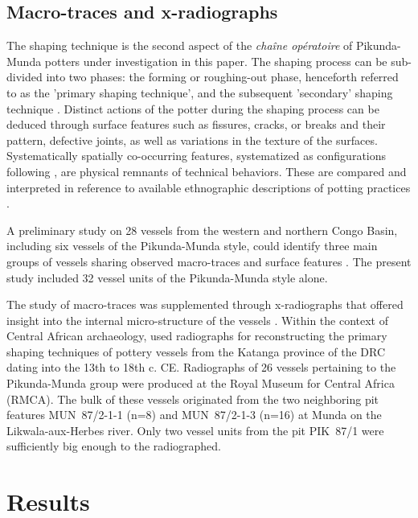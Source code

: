 \documentclass[smallextended,natbib]{svjour3}       %
\begin{document}
\subsection{Macro-traces and x-radiographs}

The shaping technique is the second aspect of the \textit{chaîne opératoire} of Pikunda-Munda potters under investigation in this paper. The shaping process can be sub-divided into two phases: the forming or roughing-out phase, henceforth referred to as the 'primary shaping technique', and the subsequent 'secondary' shaping technique \citep{Shepard.1956,Rye.1981,LivingstoneSmith.2007d,LivingstoneSmith.2010c}. Distinct actions of the potter during the shaping process can be deduced through surface features such as fissures, cracks, or breaks and their pattern, defective joints, as well as variations in the texture of the surfaces. Systematically spatially co-occurring features, systematized as configurations following \citet{LivingstoneSmith.2007d,LivingstoneSmith.2010c}, are physical remnants of technical behaviors. These are compared and interpreted in reference to available ethnographic descriptions of potting practices \citep{Eggert.1980c,KanimbaMisago.1991,Eggert.inVorb.}.

A preliminary study on 28 vessels from the western and northern Congo Basin, including six vessels of the Pikunda-Munda style, could identify three main groups of vessels sharing observed macro-traces and surface features \citep[45--60,69--73]{Seidensticker.2021e}. The present study included 32 vessel units of the Pikunda-Munda style alone.

The study of macro-traces was supplemented through x-radiographs that offered insight into the internal micro-structure of the vessels \citep{Stevenson.1953,Rye.1977,Vandiver.1987}. Within the context of Central African archaeology, \citet{LivingstoneSmith.2010c} used radiographs for reconstructing the primary shaping techniques of pottery vessels from the Katanga province of the DRC dating into the 13th to 18th c. CE. Radiographs of 26 vessels pertaining to the Pikunda-Munda group were produced at the Royal Museum for Central Africa (RMCA). The bulk of these vessels originated from the two neighboring pit features MUN~87/2-1-1 (n=8) and MUN~87/2-1-3 (n=16) at Munda on the Likwala-aux-Herbes river. Only two vessel units from the pit PIK~87/1 were sufficiently big enough to the radiographed.

\section{Results}
\end{document}
